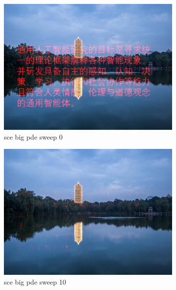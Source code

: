 \documentclass[11pt]{article}
\begin{document}
\begin{figure}[ht!]
    \centering
    \hfill%
    \begin{subfigure}[]{0.333\linewidth}
        \centering
        \includegraphics[width=\linewidth]{fig/restoration/sce_big/pde_0.jpg}
        \caption{sce big pde sweep 0}
    \end{subfigure}%
    \hfill%
    \begin{subfigure}[]{0.333\linewidth}
        \centering
        \includegraphics[width=\linewidth]{fig/restoration/sce_big/pde_10.jpg}
        \caption{sce big pde sweep 10}
    \end{subfigure}%
    \hfill%
    \begin{subfigure}[]{0.333\linewidth}

\end{subfigure}
\end{figure}
\end{document}
